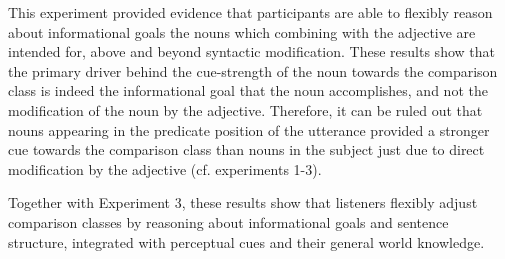 This experiment provided evidence that participants are able to flexibly reason about informational goals the nouns which combining with the adjective are intended for, above and beyond syntactic modification. These results show that the primary driver behind the cue-strength of the noun towards the comparison class is indeed the informational goal that the noun accomplishes, and not the modification of the noun by the adjective.  Therefore, it can be ruled out that nouns appearing in the predicate position of the utterance provided a stronger cue towards the comparison class than nouns in the subject just due to direct modification by the adjective (cf. experiments 1-3). 

Together with Experiment 3, these results show that listeners flexibly adjust comparison classes by reasoning about informational goals and sentence structure, integrated with perceptual cues and their general world knowledge.   
   
